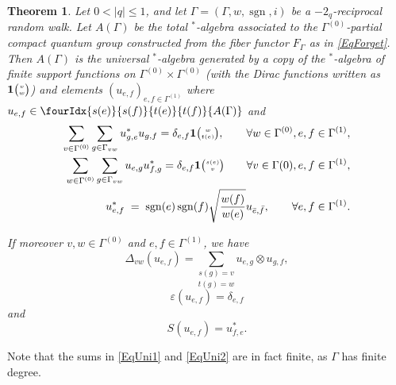 \documentclass[11pt]{article}
\DeclareMathOperator{\sgn}{\mathrm{sgn}}
\newcommand{\Grt}[3]{#1{\tiny {\begin{pmatrix} #2\\#3\end{pmatrix}}}}
\newcommand{\UnitC}[2]{\Grt{\mathbf{1}}{#1}{#2}}
\newcommand{\Grru}[2]{{\tiny \begin{pmatrix} #1 \\ #2\end{pmatrix}}}
\newcommand{\Gr}[5]{\fourIdx{#2}{#4}{#3}{#5}{#1}}%
\newtheorem{Theorem}{Theorem}[section]
\theoremstyle{definition}
\numberwithin{equation}{section}
\begin{document}
\begin{Theorem}\label{TheoGenRel} Let $0<|q|\leq 1$, and let $\Gamma = (\Gamma,w,\sgn,i)$ be a $-2_q$-reciprocal random walk. Let $A(\Gamma)$ be the total $^*$-algebra associated to the $\Gamma^{(0)}$-partial compact quantum group constructed from the fiber functor $F_{\Gamma}$ as in \eqref{EqForget}. Then $A(\Gamma)$ is the universal $^*$-algebra generated by a copy of the $^*$-algebra of finite support functions on $\Gamma^{(0)}\times \Gamma^{(0)}$ (with the Dirac functions written as $\UnitC{v}{w}$) and elements $(u_{e,f})_{e,f\in \Gamma^{(1)}}$ where $u_{e,f}\in \Gr{A(\Gamma)}{s(e)}{t(e)}{s(f)}{t(f)}$ and 
\begin{eqnarray} 
\label{EqUni1}\sum_{v\in \Gamma^{(0)}}\sum_{g\in \Gamma_{vw}} u_{g,e}^*u_{g,f} = \delta_{e,f}\mathbf{1}\Grru{w}{t(e)}, \qquad \forall w\in \Gamma^{(0)}, e,f\in \Gamma^{(1)},\\ %
\label{EqUni2}\sum_{w\in \Gamma^{(0)}} \sum_{g\in \Gamma_{vw}} u_{e,g}u_{f,g}^* = \delta_{e,f} \mathbf{1}\Grru{s(e)}{v}\qquad \forall v\in \Gamma{(0)}, e,f\in \Gamma^{(1)},\\ 
\label{EqInt}u_{e,f}^* \;=\; \sgn(e)\sgn(f)\sqrt{\frac{w(f)}{w(e)}} u_{\bar{e},\bar{f}},\qquad \forall e,f\in \Gamma^{(1)}.
\end{eqnarray}

If moreover $v,w\in \Gamma^{(0)}$ and $e,f\in \Gamma^{(1)}$, we have \[\Delta_{vw}(u_{e,f}) = \underset{t(g) = w}{\sum_{s(g) = v}} u_{e,g}\otimes u_{g,f},\]
\[\varepsilon(u_{e,f}) = \delta_{e,f}\] and \[S(u_{e,f}) = u_{f,e}^*.\] 
\end{Theorem} 

Note that the sums in \eqref{EqUni1} and \eqref{EqUni2} are in fact finite, as $\Gamma$ has finite degree. 
\end{document}
